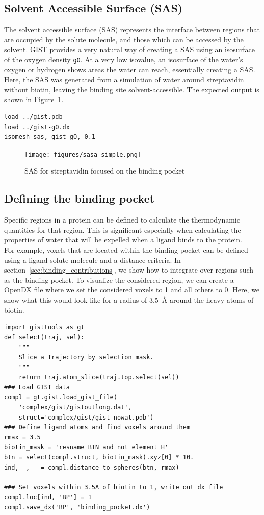 \documentclass[9pt,tutorial]{livecoms}
\newcommand{\code}{\texttt}
\begin{document}
\subsection{Solvent Accessible Surface (SAS)}
The solvent accessible surface (SAS) represents the interface between regions that are occupied by the solute molecule, and those which can be accessed by the solvent.
GIST provides a very natural way of creating a SAS using an isosurface of the oxygen density \code{gO}.
At a very low isovalue, an isosurface of the water's oxygen or hydrogen shows areas the water can reach, essentially creating a SAS. 
Here, the SAS was generated from a simulation of water around streptavidin without biotin, leaving the binding site solvent-accessible.
The expected output is shown in Figure~\ref{fig-streptavidin_sasa}.

\begin{lstlisting}[style=pymol]
load ../gist.pdb
load ../gist-gO.dx
isomesh sas, gist-gO, 0.1
\end{lstlisting}

\begin{figure}
	\centering
	\texttt{[image: figures/sasa-simple.png]}
	\caption{SAS for streptavidin focused on the binding pocket}\label{fig-streptavidin_sasa}
\end{figure}
\subsection{Defining the binding pocket}
Specific regions in a protein can be defined to calculate the thermodynamic quantities for that region.
This is significant especially when calculating the properties of water that will be expelled when a ligand binds to the protein.\\
For example, voxels that are located within the binding pocket can be defined using a ligand solute molecule and a distance criteria. 
In section~\ref{sec:binding_contributions}, we show how to integrate over regions such as the binding pocket. 
To visualize the considered region, we can create a OpenDX file where we set the considered voxels to 1 and all others to 0. Here, we show what this would look like for a radius of \SI{3.5}{\angstrom} around the heavy atoms of biotin. 

\begin{lstlisting}[style=python]
import gisttools as gt
def select(traj, sel):
	""" 
	Slice a Trajectory by selection mask. 
	"""
	return traj.atom_slice(traj.top.select(sel))
### Load GIST data
compl = gt.gist.load_gist_file(
	'complex/gist/gistoutlong.dat', 
	struct='complex/gist/gist_nowat.pdb')
### Define ligand atoms and find voxels around them
rmax = 3.5
biotin_mask = 'resname BTN and not element H'
btn = select(compl.struct, biotin_mask).xyz[0] * 10.
ind, _, _ = compl.distance_to_spheres(btn, rmax)

### Set voxels within 3.5A of biotin to 1, write out dx file
compl.loc[ind, 'BP'] = 1
compl.save_dx('BP', 'binding_pocket.dx')
\end{lstlisting}
\end{document}
